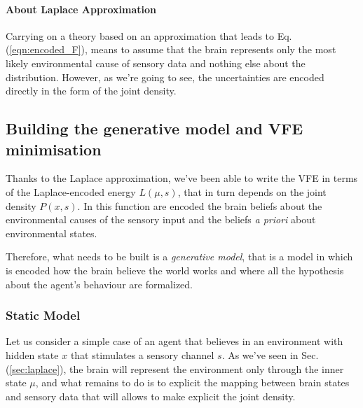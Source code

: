 \documentclass[a4paper, 10pt]{article}
\begin{document}
\paragraph{About Laplace Approximation}
Carrying on a theory based on an approximation that leads to Eq.(\ref{eqn:encoded_F}), means to assume that the brain represents only the most likely environmental cause of sensory data and nothing else about the distribution. However, as we're going to see, the uncertainties are encoded directly in the form of the joint density.



\subsection{Building the generative model and VFE minimisation}
\label{sec:G}
Thanks to the Laplace approximation, we've been able to write the VFE in terms of the Laplace-encoded energy $L(\mu,s)$, that in turn depends on the joint density $P(x, s)$. In this function are encoded the brain beliefs about the environmental causes of the sensory input and the beliefs \emph{a priori} about environmental states.

Therefore, what needs to be built is a \emph{generative model}, that is a model in which is encoded how the brain believe the world works and where all the hypothesis about the agent's behaviour are formalized.

\subsubsection{Static Model}

Let us consider a simple case of an agent that believes in an environment with hidden state $ x$ that stimulates a sensory channel $ s$. As we've seen in Sec.(\ref{sec:laplace}), the brain will represent the environment only through the inner state $\mu$, and what remains to do is to explicit the mapping between brain states and sensory data that will allows to make explicit the joint density.
\end{document}
